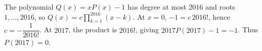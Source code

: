 The polynomial $Q(x)=xP(x)-1$ has degree at most $2016$ and roots $1,\ldots,2016$, so $Q(x)=c\prod_{k=1}^{2016}(x-k)$. At $x=0$, $-1=c\,2016!$, hence $c=-\dfrac{1}{2016!}$. At $2017$, the product is $2016!$, giving $2017P(2017)-1=-1$. Thus $\boxed{P(2017)=0}$.
